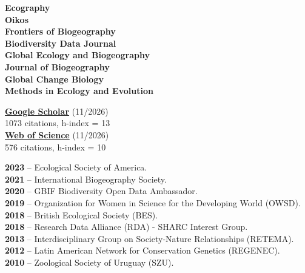 \documentclass[9pt]{developercv} %
\begin{document}
\begin{minipage}[t]{0.35\textwidth}
	\vspace{-\baselineskip} %
	
	\textbf{Ecography}\\
	\textbf{Oikos}\\
	\textbf{Frontiers of Biogeography}\\
	\textbf{Biodiversity Data Journal}\\
	\textbf{Global Ecology and Biogeography}\\
	\textbf{Journal of Biogeography}\\
	\textbf{Global Change Biology}\\
	\textbf{Methods in Ecology and Evolution}


	\textbf{\href{https://scholar.google.com/citations?user=9KCM81IAAAAJ&hl}{Google Scholar}} (11/2026)\\
	1073 citations, h-index = 13\\
	\textbf{\href{https://www.webofscience.com/wos/author/record/ADQ-1257-2022}{Web of Science}} (11/2026)\\
	576 citations, h-index = 10\\
	
\end{minipage} 
\hfill
\begin{minipage}[t]{0.65\textwidth}
	\vspace{-\baselineskip} %


	\textbf{2023} -- Ecological Society of America.\\
	\textbf{2021} -- International Biogeography Society.\\
	\textbf{2020} -- GBIF Biodiversity Open Data Ambassador.\\
	\textbf{2019} -- Organization for Women in Science for the Developing World (OWSD).\\
	\textbf{2018} -- British Ecological Society (BES).\\ 
	\textbf{2018} -- Research Data Alliance (RDA) - SHARC Interest Group.\\ 
	\textbf{2013} -- Interdisciplinary Group on Society-Nature Relationships (RETEMA).\\
	\textbf{2012} -- Latin American Network for Conservation Genetics (REGENEC).\\
	\textbf{2010} -- Zoological Society of Uruguay (SZU).\\\\
	
\end{minipage} 
\end{document}
